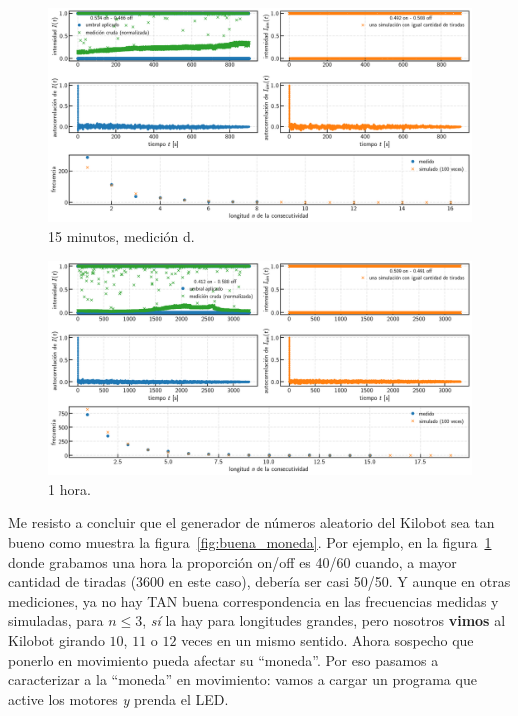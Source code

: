 \documentclass[a4paper]{article}
\begin{document}
\begin{figure}[!h]
	\centering
	\includegraphics[width=\linewidth]{Resultados/15min_d.png}
	\caption{15 minutos, medición d.}
\end{figure}

\begin{figure}[!h]
	\centering
	\includegraphics[width=\linewidth]{Resultados/1h.png}
	\caption{1 hora.}
	\label{fig:1hora}
\end{figure}

Me resisto a concluir que el generador de números aleatorio del Kilobot sea tan bueno como muestra la figura~\ref{fig:buena_moneda}. Por ejemplo, en la figura~\ref{fig:1hora} donde grabamos una hora la proporción on/off es 40/60 cuando, a mayor cantidad de tiradas ($3600$ en este caso), debería ser casi 50/50. Y aunque en otras mediciones, ya no hay TAN buena correspondencia en las frecuencias medidas y simuladas, para $n \leq 3$, \emph{sí} la hay para longitudes grandes, pero nosotros \textbf{vimos} al Kilobot girando $10$, $11$ o $12$ veces en un mismo sentido. Ahora sospecho que ponerlo en movimiento pueda afectar su ``moneda''. Por eso pasamos a caracterizar a la ``moneda'' en movimiento: vamos a cargar un programa que active los motores \emph{y} prenda el LED.
\end{document}
